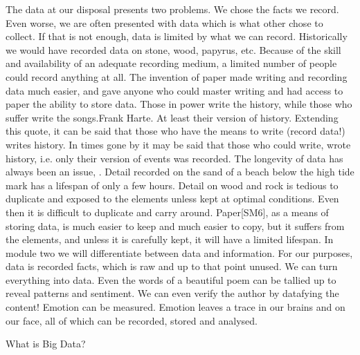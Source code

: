 The data at our disposal presents two problems.  We chose the facts we record.  Even worse, we are often presented with data which is what other chose to collect.  If that is not enough, data is limited by what we can record.  Historically we would have recorded data on stone, wood, papyrus, etc.  Because of the skill and availability of an adequate recording medium, a limited number of people could record anything at all.  The invention of paper made writing and recording data much easier, and gave anyone who could master writing and had access to paper the ability to store data.  Those in power write the history, while those who suffer write the songs.Frank Harte.  At least their version of history.  Extending this quote, it can be said that those who have the means to write (record data!) writes history.  In times gone by it may be said that those who could write, wrote history, i.e. only their version of events was recorded. 
The longevity of data has always been an issue, \cite{Mor16}.  Detail recorded on the sand of a beach below the high tide mark has a lifespan of only a few hours.  Detail on wood and rock is tedious to duplicate and exposed to the elements unless kept at optimal conditions.  Even then it is difficult to duplicate and carry around.  Paper[SM6], as a means of storing data, is much easier to keep and much easier to copy, but it suffers from the elements, and unless it is carefully kept, it will have a limited lifespan.  In module two we will differentiate between data and information. For our purposes, data is recorded facts, which is raw and up to that point unused.
We can turn everything into data.  Even the words of a beautiful poem can be tallied up to reveal patterns and sentiment.  We can even verify the author by datafying the content!  Emotion can be measured.  Emotion leaves a trace in our brains and on our face, all of which can be recorded, stored and analysed.

What is Big Data?

